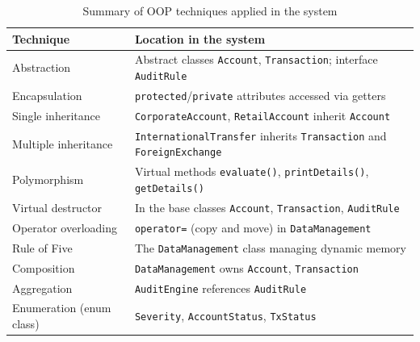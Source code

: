     \begin{table}[H]
        \centering
        \caption{Summary of OOP techniques applied in the system}
        \label{tab:oop_techniques}
        \begin{tabular}{|l|p{8cm}|}
            \hline
            \textbf{Technique} & \textbf{Location in the system} \\ \hline
            Abstraction & Abstract classes \texttt{Account}, \texttt{Transaction}; interface \texttt{AuditRule} \\ \hline
            Encapsulation & \texttt{protected}/\texttt{private} attributes accessed via getters \\ \hline
            Single inheritance & \texttt{CorporateAccount}, \texttt{RetailAccount} inherit \texttt{Account} \\ \hline
            Multiple inheritance & \texttt{InternationalTransfer} inherits \texttt{Transaction} and \texttt{ForeignExchange} \\ \hline
            Polymorphism & Virtual methods \texttt{evaluate()}, \texttt{printDetails()}, \texttt{getDetails()} \\ \hline
            Virtual destructor & In the base classes \texttt{Account}, \texttt{Transaction}, \texttt{AuditRule} \\ \hline
            Operator overloading & \texttt{operator=} (copy and move) in \texttt{DataManagement} \\ \hline
            Rule of Five & The \texttt{DataManagement} class managing dynamic memory \\ \hline
            Composition & \texttt{DataManagement} owns \texttt{Account}, \texttt{Transaction} \\ \hline
            Aggregation & \texttt{AuditEngine} references \texttt{AuditRule} \\ \hline
            Enumeration (enum class) & \texttt{Severity}, \texttt{AccountStatus}, \texttt{TxStatus} \\ \hline
        \end{tabular}
    \end{table}
